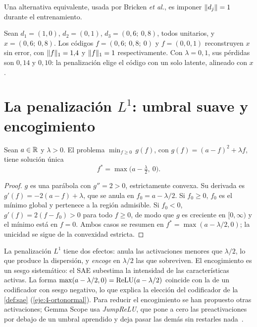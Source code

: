 Una alternativa equivalente, usada por Bricken \emph{et al.}, es imponer $\lVert d_j\rVert=1$ durante el entrenamiento.

\begin{ejemplo}\label{ej:sae}
Sean $d_1=(1,0)$, $d_2=(0,1)$, $d_3=(0{,}6;\allowbreak\ 0{,}8)$, todos unitarios, y $x=(0{,}6;\allowbreak\ 0{,}8)$. Los códigos $f=(0{,}6;\allowbreak\ 0{,}8;\allowbreak\ 0)$ y $f=(0,0,1)$ reconstruyen $x$ sin error, con $\lVert f\rVert_1=1{,}4$ y $\lVert f\rVert_1=1$ respectivamente. Con $\lambda=0{,}1$, sus pérdidas son $0{,}14$ y $0{,}10$: la penalización elige el código con un solo latente, alineado con $x$.
\end{ejemplo}

\section{La penalización \texorpdfstring{$L^{1}$}{L1}: umbral suave y encogimiento}

\begin{proposicion}\label{prop:umbral}
Sean $a\in\mathbb{R}$ y $\lambda>0$. El problema $\min_{f\ge 0}\,g(f)$, con $g(f)=(a-f)^{2}+\lambda f$, tiene solución única
\[
f^{*}=\max\bigl(a-\tfrac{\lambda}{2},\ 0\bigr).
\]
\end{proposicion}

\begin{proof}
$g$ es una parábola con $g''=2>0$, estrictamente convexa. Su derivada es $g'(f)=-2(a-f)+\lambda$, que se anula en $f_0=a-\lambda/2$. Si $f_0\ge 0$, $f_0$ es el mínimo global y pertenece a la región admisible. Si $f_0<0$, $g'(f)=2(f-f_0)>0$ para todo $f\ge 0$, de modo que $g$ es creciente en $[0,\infty)$ y el mínimo está en $f=0$. Ambos casos se resumen en $f^{*}=\max(a-\lambda/2,0)$; la unicidad se sigue de la convexidad estricta.
\end{proof}

La penalización $L^{1}$ tiene dos efectos: anula las activaciones menores que $\lambda/2$, lo que produce la dispersión, y \emph{encoge} en $\lambda/2$ las que sobreviven. El encogimiento es un sesgo sistemático: el SAE subestima la intensidad de las características activas. La forma $\max(a-\lambda/2,0)=\operatorname{ReLU}(a-\lambda/2)$ coincide con la de un codificador con sesgo negativo, lo que explica la elección del codificador de la \cref{def:sae} (\cref{eje:4-ortonormal}). Para reducir el encogimiento se han propuesto otras activaciones; Gemma Scope usa \emph{JumpReLU}, que pone a cero las preactivaciones por debajo de un umbral aprendido y deja pasar las demás sin restarles nada~\cite{gemmascope}.

